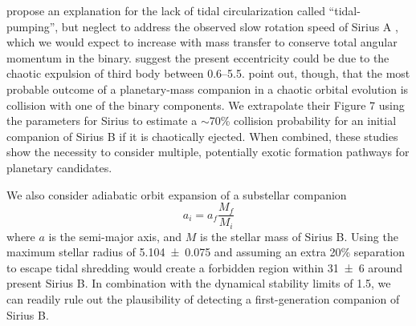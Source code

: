 \documentclass[twocolumn]{aastex631}
\begin{document}
\citet{bonacicmarinovicOrbitalEccentricitiesBinary2008} propose an explanation for the lack of tidal circularization called ``tidal-pumping'', but neglect to address the observed slow rotation speed of Sirius A \citep{grayPreciseRotationRates2014,takedaRotationalVelocitySirius2020a}, which we would expect to increase with mass transfer to conserve total angular momentum in the binary. \citet{peretsTripleEvolutionDynamical2012} suggest the present eccentricity could be due to the chaotic expulsion of third body between \qtyrange{0.6}{5.5}{\solarmass}. \citet{kratterStarHoppersPlanet2012} point out, though, that the most probable outcome of a planetary-mass companion in a chaotic orbital evolution is collision with one of the binary components. We extrapolate their Figure 7 using the parameters for Sirius to estimate a $\sim$70\% collision probability for an initial companion of Sirius B if it is chaotically ejected. When combined, these studies show the necessity to consider multiple, potentially exotic formation pathways for planetary candidates.

We also consider adiabatic orbit expansion of a substellar companion
\begin{equation}
a_i = a_f \frac{M_{f}}{M_{i}}
\end{equation}
where $a$ is the semi-major axis, and $M$ is the stellar mass of Sirius B. Using the maximum stellar radius of \qty{5.104\pm0.075}{\au} and assuming an extra 20\% separation to escape tidal shredding \citep{nordhausOrbitsLowmassCompanions2013} would create a forbidden region within \qty{31\pm6}{\au} around present Sirius B. In combination with the dynamical stability limits of \qty{1.5}{\au}, we can readily rule out the plausibility of detecting a first-generation companion of Sirius B.
\end{document}

